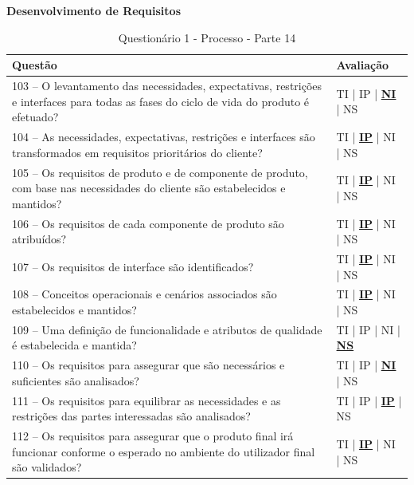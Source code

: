 \documentclass[openany,10pt,a4paper]{article}
\begin{document}
\begin{appendix}
	\centerline{\textbf{Desenvolvimento de Requisitos}}
		\begin{longtable}{|p{5in}p{1in}|}
			\caption{Questionário 1 - Processo - Parte 14}
			\endhead		
			\hline
			\textbf{Questão}  & \textbf{Avaliação}\\ 
			\hline
			103 – O levantamento das necessidades, expectativas, restrições e interfaces para todas as fases 
	do ciclo de vida do produto é efetuado?
	 & TI | IP | \underline{\textbf{NI}} | NS \\
			\hline
			104 – As necessidades, expectativas, restrições e interfaces são transformados em requisitos 
	prioritários do cliente?
	 & TI | \underline{\textbf{IP}} | NI | NS \\
			\hline
			105 – Os requisitos de produto e de componente de produto, com base nas necessidades do 
	cliente são estabelecidos e mantidos?
	 & TI | \underline{\textbf{IP}} | NI | NS \\
			\hline
			106 – Os requisitos de cada componente de produto são atribuídos?
	 & TI | \underline{\textbf{IP}} | NI | NS \\
			\hline
			107 – Os requisitos de interface são identificados?
	  & TI | \underline{\textbf{IP}} | NI | NS \\
			\hline
			108 – Conceitos operacionais e cenários associados são estabelecidos e mantidos?
	 & TI | \underline{\textbf{IP}} | NI | NS \\
	 \hline
			109 – Uma definição de funcionalidade e atributos de qualidade é estabelecida e mantida?
	 & TI | IP | NI | \underline{\textbf{NS}} \\
	 \hline
		110 – Os requisitos para assegurar que são necessários e suficientes são analisados?
	 & TI | IP | \underline{\textbf{NI}} | NS \\
	 \hline
			111 – Os requisitos para equilibrar as necessidades e as restrições das partes interessadas são 
	analisados?
	 & TI | IP | \underline{\textbf{IP}} | NS \\
			\hline
			112 – Os requisitos para assegurar que o produto final irá funcionar conforme o esperado no 
	ambiente do utilizador final são validados?
	 & TI | \underline{\textbf{IP}} | NI | NS \\
			\hline
	\end{longtable}
	

\end{appendix}
\end{document}
